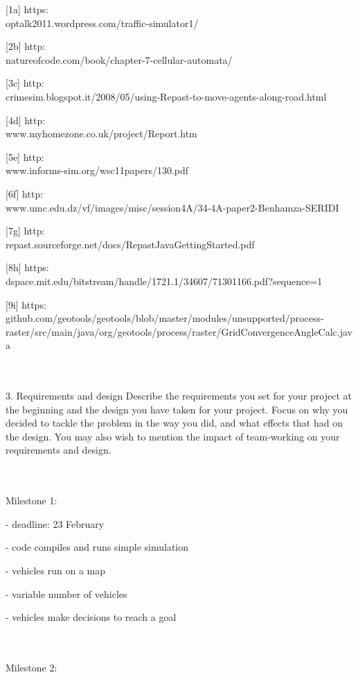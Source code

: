 \documentclass[11pt]{article}
\begin{document}
[1a]  https:\\optalk2011.wordpress.com/traffic-simulator1/

[2b]  http:\\natureofcode.com/book/chapter-7-cellular-automata/

[3c] http:\\crimesim.blogspot.it/2008/05/using-Repast-to-move-agents-along-road.html

[4d] http:\\www.myhomezone.co.uk/project/Report.htm

[5e] http:\\www.informs-sim.org/wsc11papers/130.pdf

[6f] http:\\www.umc.edu.dz/vf/images/misc/session4A/34-4A-paper2-Benhamza-SERIDI%

[7g] http:\\repast.sourceforge.net/docs/RepastJavaGettingStarted.pdf

[8h] https:\\dspace.mit.edu/bitstream/handle/1721.1/34607/71301166.pdf?sequence=1

[9i] https:\\github.com/geotools/geotools/blob/master/modules/unsupported/process-raster/src/main/java/org/geotools/process/raster/GridConvergenceAngleCalc.java

\\ \\



3. Requirements and design Describe the requirements you set for your project at the beginning and the design you have taken for your project. Focus on why you decided to tackle the problem in the way you did, and what effects that had on the design. You may also wish to mention the impact of team-working on your requirements and design.

\\ \\

Milestone 1:

- deadline: 23 February

- code compiles and runs simple simulation

- vehicles run on a map

- variable number of vehicles

- vehicles make decisions to reach a goal

\\ \\
Milestone 2:
\end{document}
